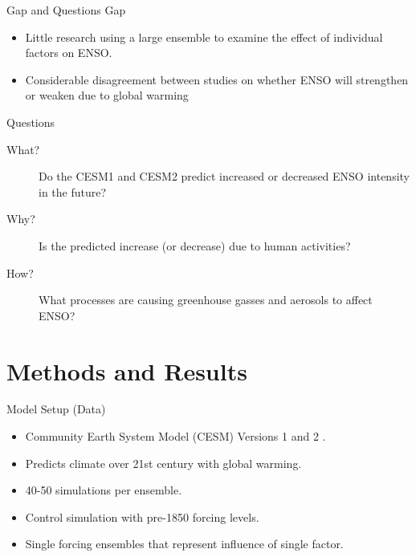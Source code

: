 \documentclass{beamer}
\begin{document}
\begin{frame}{Gap and Questions}
  \alert{Gap}
  \begin{itemize}
  \item Little research using a large ensemble to examine the effect of individual factors on ENSO.
  \item Considerable disagreement between studies on whether ENSO will strengthen or weaken due to global warming
  \end{itemize}
  \alert{Questions}
  \begin{description}
  \item[\alert{What?}] Do the CESM1 and CESM2 predict increased or decreased ENSO intensity in the future?
  \item[\alert{Why?}] Is the predicted increase (or decrease) due to human activities?
  \item[\alert{How?}] What processes are causing greenhouse gasses and aerosols to affect ENSO?
  \end{description}
\end{frame}

\section{Methods and Results}

\begin{frame}{Model Setup (Data)}
  \begin{itemize}
  \item Community Earth System Model (CESM) Versions 1 and 2 \citep{kay2015community} \citep{danabasoglu2020community}.
  \item Predicts climate over 21st century with global warming.
  \item 40-50 simulations per ensemble.
  \item Control simulation with pre-1850 forcing levels.
  \item Single forcing ensembles that represent influence of single factor.
  \end{itemize}
\end{frame}
\end{document}
